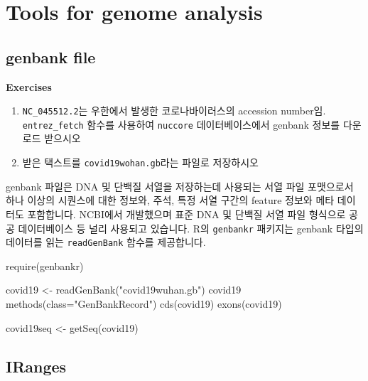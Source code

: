 \documentclass[
]{book}
\newenvironment{Shaded}{\begin{snugshade}}{\end{snugshade}}
\newcommand{\AttributeTok}[1]{\textcolor[rgb]{0.77,0.63,0.00}{#1}}
\newcommand{\FunctionTok}[1]{\textcolor[rgb]{0.00,0.00,0.00}{#1}}
\newcommand{\NormalTok}[1]{#1}
\newcommand{\OtherTok}[1]{\textcolor[rgb]{0.56,0.35,0.01}{#1}}
\newcommand{\StringTok}[1]{\textcolor[rgb]{0.31,0.60,0.02}{#1}}
\begin{document}
\hypertarget{tools-for-genome-analysis}{%
\chapter{Tools for genome analysis}\label{tools-for-genome-analysis}}

\hypertarget{genbank-file}{%
\section{genbank file}\label{genbank-file}}

\textbf{Exercises }

\begin{enumerate}
\def\labelenumi{\arabic{enumi}.}
\item
  \texttt{NC\_045512.2}는 우한에서 발생한 코로나바이러스의 accession number임. \texttt{entrez\_fetch} 함수를 사용하여 \texttt{nuccore} 데이터베이스에서 genbank 정보를 다운로드 받으시오
\item
  받은 택스트를 \texttt{covid19wohan.gb}라는 파일로 저장하시오
\end{enumerate}

genbank 파일은 DNA 및 단백질 서열을 저장하는데 사용되는 서열 파일 포맷으로서 하나 이상의 시퀀스에 대한 정보와, 주석, 특정 서열 구간의 feature 정보와 메타 데이터도 포함합니다. NCBI에서 개발했으며 표준 DNA 및 단백질 서열 파일 형식으로 공공 데이터베이스 등 널리 사용되고 있습니다. R의 \texttt{genbankr} 패키지는 genbank 타입의 데이터를 읽는 \texttt{readGenBank} 함수를 제공합니다.

\begin{Shaded}
\begin{Highlighting}[]
\FunctionTok{require}\NormalTok{(genbankr)}

\NormalTok{covid19 }\OtherTok{\textless{}{-}} \FunctionTok{readGenBank}\NormalTok{(}\StringTok{"covid19wuhan.gb"}\NormalTok{)}
\NormalTok{covid19}
\FunctionTok{methods}\NormalTok{(}\AttributeTok{class=}\StringTok{"GenBankRecord"}\NormalTok{)}
\FunctionTok{cds}\NormalTok{(covid19)}
\FunctionTok{exons}\NormalTok{(covid19)}

\NormalTok{covid19seq }\OtherTok{\textless{}{-}} \FunctionTok{getSeq}\NormalTok{(covid19)}
\end{Highlighting}
\end{Shaded}

\hypertarget{iranges}{%
\section{IRanges}\label{iranges}}
\end{document}
